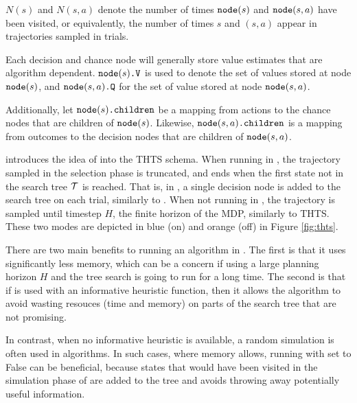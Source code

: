             $N(s)$ and $N(s,a)$ denote the number of times ${\textnormal{\texttt{node}}}(s)$ and ${\textnormal{\texttt{node}}}(s,a)$ have been visited, or equivalently, the number of times $s$ and $(s,a)$ appear in trajectories sampled in \thtspp\ewe trials.

            Each decision and chance node will generally store value estimates that are algorithm dependent. ${{\textnormal{\texttt{node}}}(s)\textnormal{\texttt{.V}}}$ is used to denote the set of values stored at node ${\textnormal{\texttt{node}}}(s)$, and ${{\textnormal{\texttt{node}}}(s,a)\textnormal{\texttt{.Q}}}$ for the set of value stored at node ${\textnormal{\texttt{node}}}(s,a)$. 

            Additionally, let ${\textnormal{\texttt{node}}}(s){\textnormal{\texttt{.children}}}$ be a mapping from actions to the chance nodes that are children of ${\textnormal{\texttt{node}}}(s)$. Likewise, ${\textnormal{\texttt{node}}}(s,a){\textnormal{\texttt{.children}}}$ is a mapping from outcomes to the decision nodes that are children of ${\textnormal{\texttt{node}}}(s,a)$.


        \thtspp\ewe introduces the idea of \mctsmode\ewe into the THTS schema. When running in \mctsmode, the trajectory sampled in the selection phase is truncated, and ends when the first state not in the search tree $\mathcal{T}$ is reached. That is, in \mctsmode, a single decision node is added to the search tree on each trial, similarly to \mctsone.  When not running in \mctsmode, the trajectory is sampled until timestep $H$, the finite horizon of the MDP, similarly to THTS. These two modes are depicted in blue (\mctsmode\ewe on) and orange (\mctsmode\ewe off) in Figure \ref{fig:thts}. 

        There are two main benefits to running an algorithm in \mctsmode. The first is that it uses significantly less memory, which can be a concern if using a large planning horizon $H$ and the tree search is going to run for a long time. The second is that if \mctsmode\ewe is used with an informative heuristic function, then it allows the algorithm to avoid wasting resouces (time and memory) on parts of the search tree that are not promising. 
        
        In contrast, when no informative heuristic is available, a random simulation is often used in \mctsone algorithms. In such cases, where memory allows, running with \mctsmode\ewe set to False can be beneficial, because states that would have been visited in the simulation phase of \mctsone are added to the tree and avoids throwing away potentially useful information.


